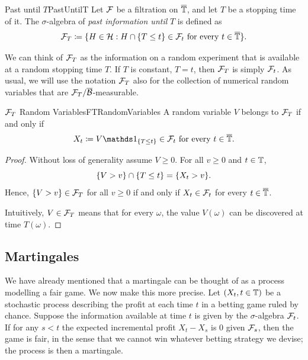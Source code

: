 \begin{defn}{Past until $T$}{PastUntilT}
	Let $\mathcal{F}$ be a filtration on $\overline{\mathbb{T}}$, and let $T$ be a stopping time of it. The $\sigma$-algebra of \emph{past information until} $T$ is defined as
	\begin{equation*}
		\mathcal{F}_T \coloneqq \{H \in \mathcal{H} : H \cap \{T \le t\} \in \mathcal{F}_t \text{ for every } t \in \overline{\mathbb{T}}\}.
	\end{equation*}
\end{defn}

We can think of $\mathcal{F}_T$ as the information on a random experiment that is available at a random stopping time $T$. If $T$ is constant, $T = t$, then $\mathcal{F}_T$ is simply $\mathcal{F}_t$. As usual, we will use the notation $\mathcal{F}_T$ also for the collection of numerical random variables that are $\mathcal{F}_T/\overline{\mathcal{B}}$-measurable.

\begin{thm}{$\mathcal{F}_T$ Random Variables}{FTRandomVariables}
	A random variable $V$ belongs to $\mathcal{F}_T$ if and only if
	\begin{equation*}
		X_t \coloneqq V \I_{\{T \le t\}} \in \cF_t \text{ for every } t \in \overline{\bb{T}}.
	\end{equation*}
\end{thm}

\begin{proof}
	Without loss of generality assume $V \ge 0$. For all $v \ge 0$ and $t \in \mathbb{T}$,
	\[
		\{V > v\} \cap \{T \le t\} = \{X_t > v\}.
	\]
	Hence, $\{V > v\} \in \mathcal{F}_T$ for all $v \ge 0$ if and only if $X_t \in \mathcal{F}_t$ for every $t \in \overline{\mathbb{T}}$.

	Intuitively, $V \in \mathcal{F}_T$ means that for every $\omega$, the value $V(\omega)$ can be discovered at time $T(\omega)$.
\end{proof}
\subsection{Martingales}
We have already mentioned that a martingale can be thought of as a process modelling a fair game. We now make this more precise. Let $(X_t, t \in \mathbb{T})$ be a stochastic process describing the profit at each time $t$ in a betting game ruled by chance. Suppose the information available at time $t$ is given by the $\sigma$-algebra $\mathcal{F}_t$. If for any $s < t$ the expected incremental profit $X_t - X_s$ is $0$ given $\mathcal{F}_s$, then the game is fair, in the sense that we cannot win whatever betting strategy we devise; the process is then a martingale.

